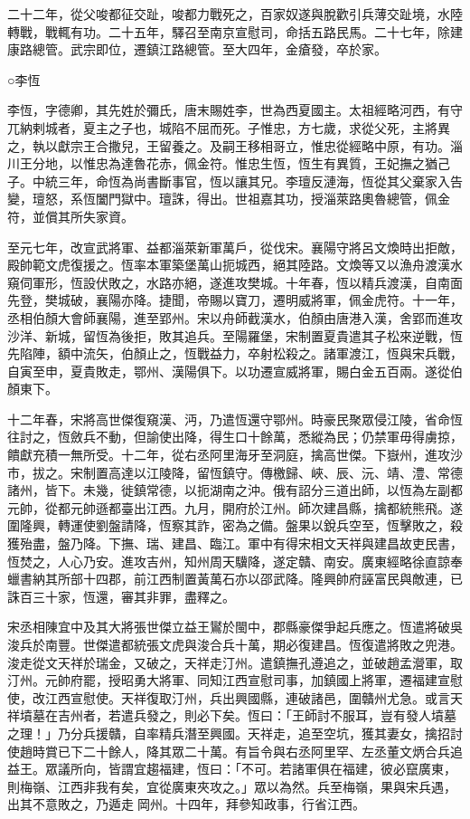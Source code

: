\begin{pinyinscope}
 二十二年，從父唆都征交趾，唆都力戰死之，百家奴遂與脫歡引兵薄交趾境，水陸轉戰，戰輒有功。二十五年，驛召至南京宣慰司，命括五路民馬。二十七年，除建康路總管。武宗即位，遷鎮江路總管。至大四年，金瘡發，卒於家。



 ○李恆



 李恆，字德卿，其先姓於彌氏，唐末賜姓李，世為西夏國主。太祖經略河西，有守兀納剌城者，夏主之子也，城陷不屈而死。子惟忠，方七歲，求從父死，主將異之，執以獻宗王合撒兒，王留養之。及嗣王移相哥立，惟忠從經略中原，有功。淄川王分地，以惟忠為達魯花赤，佩金符。惟忠生恆，恆生有異質，王妃撫之猶己子。中統三年，命恆為尚書斷事官，恆以讓其兄。李璮反漣海，恆從其父棄家入告變，璮怒，系恆闔門獄中。璮誅，得出。世祖嘉其功，授淄萊路奧魯總管，佩金符，並償其所失家資。



 至元七年，改宣武將軍、益都淄萊新軍萬戶，從伐宋。襄陽守將呂文煥時出拒敵，殿帥範文虎復援之。恆率本軍築堡萬山扼城西，絕其陸路。文煥等又以漁舟渡漢水窺伺軍形，恆設伏敗之，水路亦絕，遂進攻樊城。十年春，恆以精兵渡漢，自南面先登，樊城破，襄陽亦降。捷聞，帝賜以寶刀，遷明威將軍，佩金虎符。十一年，丞相伯顏大會師襄陽，進至郢州。宋以舟師截漢水，伯顏由唐港入漢，舍郢而進攻沙洋、新城，留恆為後拒，敗其追兵。至陽羅堡，宋制置夏貴遣其子松來逆戰，恆先陷陣，額中流矢，伯顏止之，恆戰益力，卒射松殺之。諸軍渡江，恆與宋兵戰，自寅至申，夏貴敗走，鄂州、漢陽俱下。以功遷宣威將軍，賜白金五百兩。遂從伯顏東下。



 十二年春，宋將高世傑復窺漢、沔，乃遣恆還守鄂州。時豪民聚眾侵江陵，省命恆往討之，恆斂兵不動，但諭使出降，得生口十餘萬，悉縱為民；仍禁軍毋得虜掠，饋獻充積一無所受。十二年，從右丞阿里海牙至洞庭，擒高世傑。下嶽州，進攻沙市，拔之。宋制置高達以江陵降，留恆鎮守。傳檄歸、峽、辰、沅、靖、澧、常德諸州，皆下。未幾，徙鎮常德，以扼湖南之沖。俄有詔分三道出師，以恆為左副都元帥，從都元帥遜都臺出江西。九月，開府於江州。師次建昌縣，擒都統熊飛。遂圍隆興，轉運使劉盤請降，恆察其詐，密為之備。盤果以銳兵空至，恆擊敗之，殺獲殆盡，盤乃降。下撫、瑞、建昌、臨江。軍中有得宋相文天祥與建昌故吏民書，恆焚之，人心乃安。進攻吉州，知州周天驥降，遂定贛、南安。廣東經略徐直諒奉蠟書納其所部十四郡，前江西制置黃萬石亦以邵武降。隆興帥府誣富民與敵連，已誅百三十家，恆還，審其非罪，盡釋之。



 宋丞相陳宜中及其大將張世傑立益王鸑於閩中，郡縣豪傑爭起兵應之。恆遣將破吳浚兵於南豐。世傑遣都統張文虎與浚合兵十萬，期必復建昌。恆復遣將敗之兜港。浚走從文天祥於瑞金，又破之，天祥走汀州。遣鎮撫孔遵追之，並破趙孟瀯軍，取汀州。元帥府罷，授昭勇大將軍、同知江西宣慰司事，加鎮國上將軍，遷福建宣慰使，改江西宣慰使。天祥復取汀州，兵出興國縣，連破諸邑，圍贛州尤急。或言天祥墳墓在吉州者，若遣兵發之，則必下矣。恆曰：「王師討不服耳，豈有發人墳墓之理！」乃分兵援贛，自率精兵潛至興國。天祥走，追至空坑，獲其妻女，擒招討使趙時賞已下二十餘人，降其眾二十萬。有旨令與右丞阿里罕、左丞董文炳合兵追益王。眾議所向，皆謂宜趨福建，恆曰：「不可。若諸軍俱在福建，彼必竄廣東，則梅嶺、江西非我有矣，宜從廣東夾攻之。」眾以為然。兵至梅嶺，果與宋兵遇，出其不意敗之，乃遁走岡州。十四年，拜參知政事，行省江西。




\end{pinyinscope}

